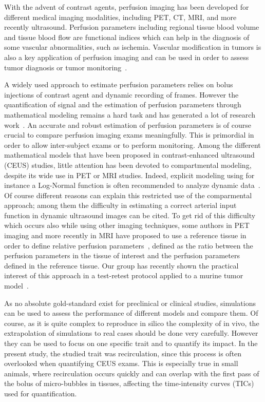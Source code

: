 With the advent of contrast agents, perfusion imaging has been developed for different medical imaging modalities, including PET, CT, MRI, and more recently ultrasound. Perfusion parameters including regional tissue blood volume and tissue blood flow are functional indices which can help in the  diagnosis of some vascular abnormalities, such as ischemia. Vascular modification in tumors is also a key application of perfusion imaging and can be used in order to assess tumor diagnosis or tumor monitoring~\cite{Dietrich:2012kw}. 

A widely used approach to estimate perfusion parameters relies on bolus injections of contrast agent and dynamic recording of frames. However the quantification of signal and the estimation of perfusion parameters through mathematical modeling remains a hard task and has generated a lot of research work~\cite{Turco:2016}. An accurate and robust estimation of perfusion parameters is of course crucial to compare perfusion imaging exams meaningfully. This is primordial in order to allow inter-subject exams or to perform monitoring. 
Among the different mathematical models that have been proposed in contrast-enhanced ultrasound (CEUS) studies, little attention has been devoted to compartmental modeling, despite its wide use in PET or MRI studies. Indeed, explicit modeling using for instance a Log-Normal function is often recommended to analyze dynamic data~\cite{Strouthos2010it,Dietrich:2012kw}.
Of course different reasons can explain this restricted use of the comparmental approach; among them the difficulty in estimating a correct arterial input function in dynamic ultrasound images can be cited. To get rid of this difficulty which occurs also while using other imaging techniques, some authors in PET imaging and more recently in MRI have proposed to use a reference tissue in order to define relative perfusion parameters~\cite{Yankeelov2005de,CardenasRodriguez:2013em}, defined as the ratio between the perfusion parameters in the tissue of interest and the perfusion parameters defined in the reference tissue. Our group has recently shown the practical interest of this approach in a test-retest protocol applied to a murine tumor model~\cite{Doury:2016fi,Doury:2017fz}. 

As no absolute gold-standard exist for preclinical or clinical studies, simulations can be used to assess the performance of different models and compare them. Of course, as it is quite complex to reproduce in silico the complexity of in vivo, the extrapolation of simulations to real cases should be done very carefully. However they can be used to focus on one specific trait and to quantify its impact. In the present study, the studied trait was recirculation, since this process is often overlooked when quantifying CEUS exams. This is especially true in small animals, where recirculation occurs quickly and can overlap with the first pass of the bolus of micro-bubbles in tissues, affecting the time-intensity curves (TICs) used for quantification.

